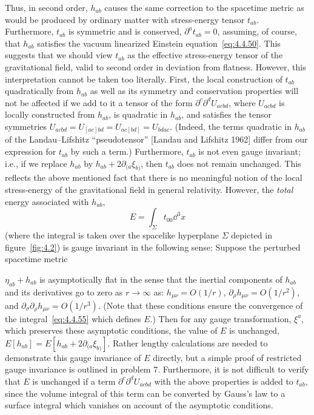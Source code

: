 Thus, in second order, \(h_{ab}\) causes the same correction to the spacetime metric
as would be produced by ordinary matter with stress-energy tensor \(t_{ab}\).
Furthermore, \(t_{ab}\) is symmetric and is conserved, \(\partial^at_{ab}=0\),
assuming, of course, that \(h_{ab}\) satisfies the vacuum linearized Einstein
equation~\eqref{eq:4.4.50}. This suggests that we should view \(t_{ab}\) as the
effective stress-energy tensor of the gravitational field, valid to second order in
deviation from flatness. However, this interpretation cannot be taken too literally.
First, the local construction of \(t_{ab}\) quadratically from \(h_{ab}\) as well as
its symmetry and conservation properties will not be affected if we add to it a tensor
of the form \(\partial^c\partial^dU_{acbd}\), where \(U_{acbd}\) is locally
constructed from \(h_{ab}\), is quadratic in \(h_{ab}\), and satisfies the tensor
symmetries \(U_{acbd}=U_{[ac]bd}=U_{ac[bd]}=U_{bdac}\). (Indeed, the terms
quadratic in \(h_{ab}\) of the Landau--Lifshitz ``pseudotensor'' [Landau and
Lifshitz 1962] differ from our expression for \(t_{ab}\) by such a term.)
Furthermore, \(t_{ab}\) is not even gauge invariant; i.e., if we replace \(h_{ab}\)
by \(h_{ab}+2\partial_{(a}\xi_{b)}\), then \(t_{ab}\) does not remain unchanged.
This reflects the above mentioned fact that there is no meaningful notion of the
local stress-energy of the gravitational field in general relativity. However, the
\emph{total} energy associated with \(h_{ab}\),
\begin{equation}
  E=\int_\Sigma t_{00}\dd^3x
  \tag{4.4.55}\label{eq:4.4.55}
\end{equation}
(where the integral is taken over the spacelike hyperplane \(\Sigma\) depicted in
figure~\ref{fig:4.2}) is gauge invariant in the following sense: Suppose the
perturbed spacetime metric

\(\eta_{ab}+h_{ab}\) is asymptotically flat in the sense that the inertial components
of \(h_{ab}\) and its derivatives go to zero as \(r\to\infty\) as:
\(h_{\mu\nu}=O(1/r)\), \(\partial_\rho h_{\mu\nu}=O(1/r^2)\), and
\(\partial_\sigma\partial_\rho h_{\mu\nu}=O(1/r^3)\). (Note that these conditions
ensure the convergence of the integral~\eqref{eq:4.4.55} which defines \(E\).)
Then for any gauge transformation, \(\xi^a\), which preserves these asymptotic
conditions, the value of \(E\) is unchanged,
\(E[h_{ab}]=E[h_{ab}+2\partial_{(a}\xi_{b)}]\). Rather lengthy calculations are
needed to demonstrate this gauge invariance of \(E\) directly, but a simple proof of
restricted gauge invariance is outlined in problem 7. Furthermore, it is not difficult
to verify that \(E\) is unchanged if a term \(\partial^c\partial^dU_{acbd}\) with
the above properties is added to \(t_{ab}\), since the volume integral of this term
can be converted by Gauss's law to a surface integral which vanishes on account of
the asymptotic conditions.

